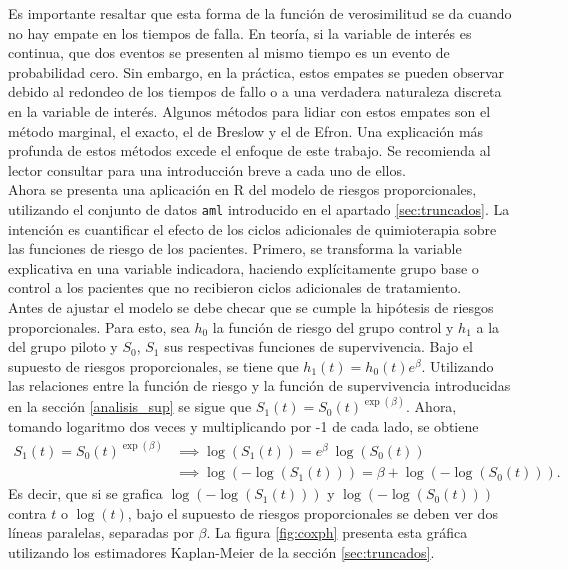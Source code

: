 \documentclass[11pt,a4paper]{article}
\begin{document}
Es importante resaltar que esta forma de la función de verosimilitud se da cuando no hay empate en los tiempos de falla. En teoría, si la variable de interés es continua, que dos eventos se presenten al mismo tiempo es un evento de probabilidad cero. Sin embargo, en la práctica, estos empates se pueden observar debido al redondeo de los tiempos de fallo o a una verdadera naturaleza discreta en la variable de interés. Algunos métodos para lidiar con estos empates son el método marginal, el exacto, el de Breslow y el de Efron. Una explicación más profunda de estos métodos excede el enfoque de este trabajo. Se recomienda al lector consultar \citet{moore} para una introducción breve a cada uno de ellos.\\

Ahora se presenta una aplicación en R del modelo de riesgos proporcionales, utilizando el conjunto de datos \texttt{aml} introducido en el apartado \ref{sec:truncados}. La intención es cuantificar el efecto de los ciclos adicionales de quimioterapia sobre las funciones de riesgo de los pacientes. Primero, se transforma la variable explicativa en una variable indicadora, haciendo explícitamente grupo base o control a los pacientes que no recibieron ciclos adicionales de tratamiento.\\

Antes de ajustar el modelo se debe checar que se cumple la hipótesis de riesgos proporcionales. Para esto, sea $h_0$  la función de riesgo del grupo control y $h_1$ a la del grupo piloto y $S_0$, $S_1$ sus respectivas funciones de supervivencia. Bajo el supuesto de riesgos proporcionales, se tiene que $h_1(t) = h_0(t) e^\beta.$ Utilizando las relaciones entre la función de riesgo y la función de supervivencia introducidas en la sección \ref{analisis_sup} se sigue que $S_1(t) = S_0(t) ^ {\exp (\beta)}.$ Ahora, tomando logaritmo dos veces y multiplicando por -1 de cada lado, se obtiene
\begin{align*}
S_1(t) = S_0(t) ^ {\exp (\beta)} &\implies \log (S_1(t)) = e^\beta \ \log (S_0(t))\\
&\implies \log (-\log (S_1(t))) = \beta + \log (-\log (S_0(t))).
\end{align*}
Es decir, que si se grafica $\log (-\log (S_1(t)))$ y $\log (-\log (S_0(t)))$ contra $t$ o $\log (t)$, bajo el supuesto de riesgos proporcionales se deben ver dos líneas paralelas, separadas por $\beta$. La figura \ref{fig:coxph} presenta esta gráfica utilizando los estimadores Kaplan-Meier de la sección \ref{sec:truncados}.\\
\end{document}
